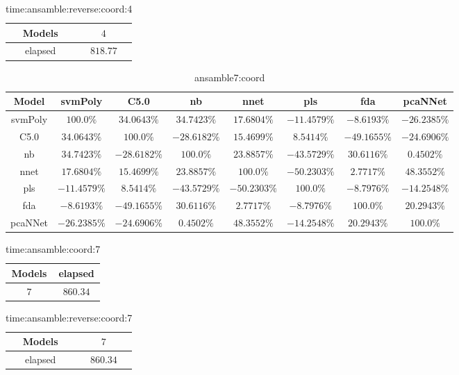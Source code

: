 \begin{table}[!ht]
	\centering
	\begin{tabular}{|c|c|}
		\hline
		Models & $4$ \\ \hline
		elapsed & $818.77$ \\ \hline
	\end{tabular}
	\caption{time:ansamble:reverse:coord:4}
	\label{tab:time:ansamble:reverse:coord:4}
\end{table}

\begin{table}[!ht]
	\centering
	\begin{tabular}{|c|c|c|c|c|c|c|c|}
		\hline
		Model & svmPoly & C5.0 & nb & nnet & pls & fda & pcaNNet \\ \hline
		svmPoly & $100.0\%$ & $34.0643\%$ & $34.7423\%$ & $17.6804\%$ & $-11.4579\%$ & $-8.6193\%$ & $-26.2385\%$ \\ \hline
		C5.0 & $34.0643\%$ & $100.0\%$ & $-28.6182\%$ & $15.4699\%$ & $8.5414\%$ & $-49.1655\%$ & $-24.6906\%$ \\ \hline
		nb & $34.7423\%$ & $-28.6182\%$ & $100.0\%$ & $23.8857\%$ & $-43.5729\%$ & $30.6116\%$ & $0.4502\%$ \\ \hline
		nnet & $17.6804\%$ & $15.4699\%$ & $23.8857\%$ & $100.0\%$ & $-50.2303\%$ & $2.7717\%$ & $48.3552\%$ \\ \hline
		pls & $-11.4579\%$ & $8.5414\%$ & $-43.5729\%$ & $-50.2303\%$ & $100.0\%$ & $-8.7976\%$ & $-14.2548\%$ \\ \hline
		fda & $-8.6193\%$ & $-49.1655\%$ & $30.6116\%$ & $2.7717\%$ & $-8.7976\%$ & $100.0\%$ & $20.2943\%$ \\ \hline
		pcaNNet & $-26.2385\%$ & $-24.6906\%$ & $0.4502\%$ & $48.3552\%$ & $-14.2548\%$ & $20.2943\%$ & $100.0\%$ \\ \hline
	\end{tabular}
	\caption{ansamble7:coord}
	\label{tab:ansamble7:coord}
\end{table}

\begin{table}[!ht]
	\centering
	\begin{tabular}{|c|c|}
		\hline
		Models & elapsed \\ \hline
		$7$ & $860.34$ \\ \hline
	\end{tabular}
	\caption{time:ansamble:coord:7}
	\label{tab:time:ansamble:coord:7}
\end{table}

\begin{table}[!ht]
	\centering
	\begin{tabular}{|c|c|}
		\hline
		Models & $7$ \\ \hline
		elapsed & $860.34$ \\ \hline
	\end{tabular}
	\caption{time:ansamble:reverse:coord:7}
	\label{tab:time:ansamble:reverse:coord:7}
\end{table}

